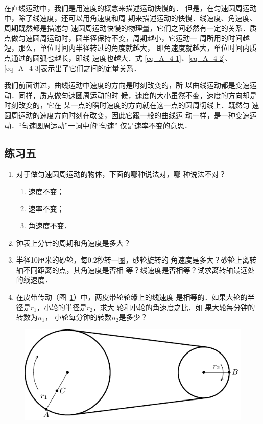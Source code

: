     在直线运动中，我们是用速度的概念来描述运动快慢的．
但是，在匀速圆周运动中，除了线速度，还可以用角速度和周
期来描述运动的快慢．线速度、角速度、周期既然都是描述匀
速圆周运动快慢的物理量，它们之间必然有一定的关系．质
点做匀速圆周运动时，圆半径保持不变，周期越小，它运动一
周所用的时间越短，那么，单位时间内半径转过的角度就越大，
即角速度就越大，单位时间内质点通过的圆弧也越长，即线
速度也越大．式 \eqref{eq_A_4-1}、\eqref{eq_A_4-2}、\eqref{eq_A_4-3}表示出了它们之间的定量关系．

    我们前面讲过，曲线运动中速度的方向是时刻改变的，所
以曲线运动都是变速运动．同样，质点做匀速圆周运动的时
候，速度的大小虽然不变，速度的方向却是时刻改变的，它在
某一点的瞬时速度的方向就在这一点的圆周切线上．既然匀
速圆周运动的速度方向时刻在改变，因此它跟一般的曲线运
动一样，是一种变速运动．“匀速圆周运动”一词中的“匀速”
仅是速率不变的意思．

\subsection*{练习五}
\begin{enumerate}
\item 对于做匀速圆周运动的物体，下面的哪种说法对，哪
种说法不对？
\begin{enumerate}
\item 速度不变；
\item 速率不变；
\item 角速度不变．
\end{enumerate}
\item 钟表上分针的周期和角速度是多大？
\item 半径10厘米的砂轮，每0.2秒转一圈，砂轮旋转的
角速度是多大？砂轮上离转轴不同距离的点，其角速度是否相
等？线速度是否相等？试求离转轴最远处的线速度．
\item 在皮带传动（图~\ref{fig_A_4-17}）中，两皮带轮轮缘上的线速度
是相等的．如果大轮的半径是$r_1$，小轮的半径是$r_2$，求大
轮和小轮的角速度之比．如
果大轮每分钟的转数为$n_1$，
小轮每分钟的转数$n_2$是多少？
\end{enumerate}

\begin{figure}[htbp]
    \centering
    \includegraphics{fig/A/4-17.pdf}
    \caption{}\label{fig_A_4-17}
\end{figure}

